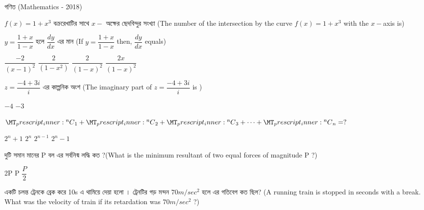 \documentclass[addpoints]{exam}
\newcommand\Mycomb[2][^n]{\prescript{#1\mkern-0.5mu}{}C_{#2}}
\begin{document}
\begin{LARGE}
\begin{center}
গণিত (Mathematics - 2018)
\end{center}
\end{LARGE}
\begin{questions}

 \question  $ f(x) = 1+x^3 $ বক্ররেখাটির সাথে $ x- $ অক্ষের ছেদবিন্দুর সংখ্যা (The number of the intersection by the curve $ f(x) = 1+x^3 $ with the $ x- $axis is)

\begin{oneparchoices}

\end{oneparchoices}

\question  $ y = \dfrac{1+x}{1-x} $ হলে $ \dfrac{dy}{dx} $ এর মান (If $ y = \dfrac{1+x}{1-x} $ then, $ \dfrac{dy}{dx} $ equals)

\begin{oneparchoices}
\choice $ \dfrac{-2}{(x-1)^2} $
\choice $ \dfrac{2}{(1-x^2)} $
\choice $ \dfrac{2}{(1-x)^2} $
\choice $ \dfrac{2x}{(1-x)^2} $

\end{oneparchoices} 

\question  $ z= \dfrac{-4+3i}{i} $ এর কাল্পনিক অংশ (The imaginary part of $ z= \dfrac{-4+3i}{i} $ is )

\begin{oneparchoices}
\choice $ -4 $
\choice  $ -3 $
\end{oneparchoices}

\question  $\Mycomb{1} + \Mycomb{2} +\Mycomb{3} + \cdots + \Mycomb{n} = ?$ 

\begin{oneparchoices}
\choice $ 2^{n} + 1 $
\choice $ 2^{n} $
\choice $ 2^{n-1} $
\choice  $ 2^{n} - 1 $
\end{oneparchoices}

\question  দুটি সমান মানের P বল এর সর্বনিন্ম লদ্ধি কত ?(What is the minimum resultant of two equal forces of magnitude P ?) 

\begin{oneparchoices}
\choice 2P
\choice P
\choice $ \dfrac{P}{2} $

\end{oneparchoices}


\question  একটি চলন্ত ট্রেনকে ব্রেক করে 10s এ থামিয়ে দেয়া হলো । ট্রেনটির গড় মন্দন $ 70m/sec^{2} $ হলে এর গতিবেগ কত ছিল? (A running train is stopped in seconds with a break. What was the velocity of train if its retardation was $ 70m/sec^{2} $ ?)


\end{questions}
\end{document}
